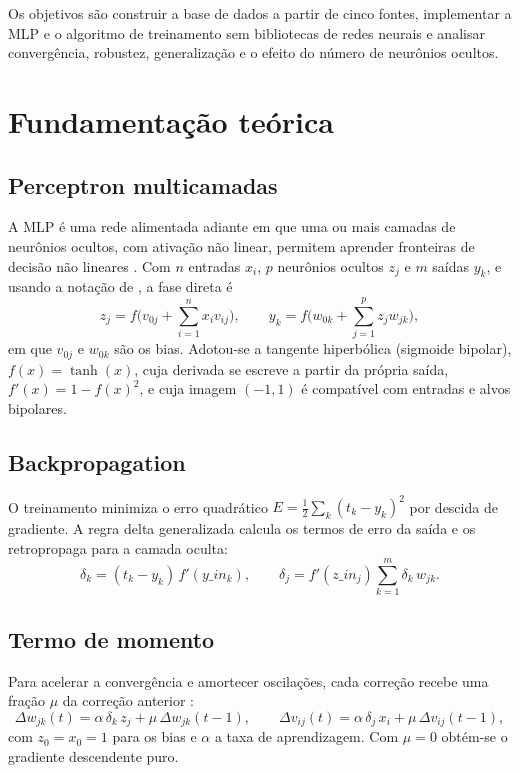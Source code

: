 \documentclass[12pt,a4paper]{article}
\begin{document}
Os objetivos são construir a base de dados a partir de cinco fontes, implementar a MLP e o
algoritmo de treinamento sem bibliotecas de redes neurais e analisar convergência,
robustez, generalização e o efeito do número de neurônios ocultos.

\section{Fundamentação teórica}

\subsection{Perceptron multicamadas}

A MLP é uma rede alimentada adiante em que uma ou mais camadas de neurônios ocultos, com
ativação não linear, permitem aprender fronteiras de decisão não lineares
\cite{haykin2009,braga2007}. Com $n$ entradas $x_i$, $p$ neurônios ocultos $z_j$ e $m$
saídas $y_k$, e usando a notação de , a fase direta é
\begin{equation}
z_j = f\Big(v_{0j} + \sum_{i=1}^{n} x_i v_{ij}\Big), \qquad
y_k = f\Big(w_{0k} + \sum_{j=1}^{p} z_j w_{jk}\Big),
\end{equation}
em que $v_{0j}$ e $w_{0k}$ são os bias. Adotou-se a tangente hiperbólica (sigmoide bipolar),
$f(x)=\tanh(x)$, cuja derivada se escreve a partir da própria saída, $f'(x)=1-f(x)^2$, e cuja
imagem $(-1,1)$ é compatível com entradas e alvos bipolares.

\subsection{Backpropagation}

O treinamento minimiza o erro quadrático $E=\frac12\sum_k (t_k-y_k)^2$ por descida de
gradiente. A regra delta generalizada \cite{rumelhart1986} calcula os termos de erro da
saída e os retropropaga para a camada oculta:
\begin{equation}
\delta_k = (t_k-y_k)\,f'(y\_in_k), \qquad
\delta_j = f'(z\_in_j)\sum_{k=1}^{m}\delta_k\,w_{jk}.
\end{equation}

\subsection{Termo de momento}

Para acelerar a convergência e amortecer oscilações, cada correção recebe uma fração $\mu$
da correção anterior \cite{haykin2009,fausett1994}:
\begin{equation}
\Delta w_{jk}(t) = \alpha\,\delta_k\,z_j + \mu\,\Delta w_{jk}(t-1), \qquad
\Delta v_{ij}(t) = \alpha\,\delta_j\,x_i + \mu\,\Delta v_{ij}(t-1),
\end{equation}
com $z_0=x_0=1$ para os bias e $\alpha$ a taxa de aprendizagem. Com $\mu=0$ obtém-se o
gradiente descendente puro.
\end{document}

